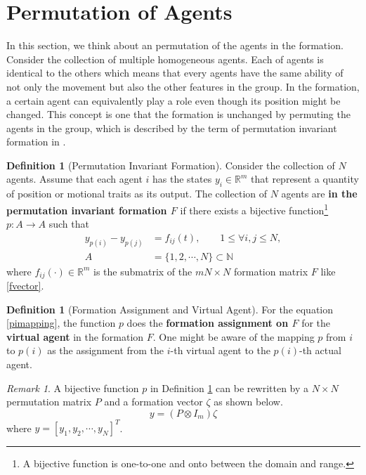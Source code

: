\documentclass[11pt, a4paper, oneside, openany, reqno]{book}
\theoremstyle{definition}
\newtheorem{definition}[theorem]{Definition}
\theoremstyle{remark}
\newtheorem{remark}[theorem]{Remark}
\numberwithin{equation}{chapter} %
\newcommand{\R}{\ensuremath{{\mathbb R}}}
\newcommand{\N}{\ensuremath{{\mathbb N}}}
\begin{document}
\section{Permutation of Agents}

In this section, we think about an permutation of the agents in the formation.
Consider the collection of multiple homogeneous agents. 
Each of agents is identical to the others
which means that every agents have the same ability of not only the movement
but also the other features in the group.
In the formation, a certain agent can equivalently play a role 
even though its position might be changed. 
This concept is one that the formation is unchanged 
by permuting the agents in the group,
which is described by the term of permutation invariant formation in \cite{kloder}.

\begin{definition}[Permutation Invariant Formation]\label{piformation}
	Consider the collection of $ N $ agents. 
	Assume that each agent $ i $ has the states $ y_i \in \R^m $ 
	that represent a quantity of position or motional traits as its output.
	The collection of $ N $ agents are \textbf{in the permutation invariant formation $ F $}
	if there exists a bijective function\footnote
	{A bijective function is one-to-one and onto between the domain and range.}
	$ p: A \rightarrow A $ such that
	\begin{equation}\begin{split}\label{pimapping}
		y_{p(i)} - y_{p(j)} &= f_{ij}(t), \qquad		1 \leq \forall i,j \leq N, \\
		A &= \lbrace 1,2,\cdots,N \rbrace \subset \N
	\end{split}\end{equation}
	where $ f_{ij}(\cdot) \in \R^m $ is the submatrix   
	of the $ mN \times N $ formation matrix $ F $ like \eqref{fvector}.	
\end{definition}

\begin{definition}[Formation Assignment and Virtual Agent]
	For the equation \eqref{pimapping}, 
	the function $ p $ does the \textbf{formation assignment on $ F $}
	for the \textbf{virtual agent} in the formation $ F $.
	One might be aware of the mapping $ p $ from $ i $ to $ p(i) $ as 
	the assignment from the $ i $-th virtual agent to the $ p(i) $-th actual agent.
\end{definition}

\begin{remark}
	A bijective function $ p $ in Definition \ref{piformation} can be rewritten 
	by a $ N \times N $ permutation matrix $ P $ 
	and a formation vector $ \zeta $ as shown below.
	\begin{equation}
		y = \left( P \otimes I_m \right) \zeta
	\end{equation}
	where $ y = \left[ y_1,y_2,\cdots,y_N \right]^T $.
\end{remark}
\end{document}
